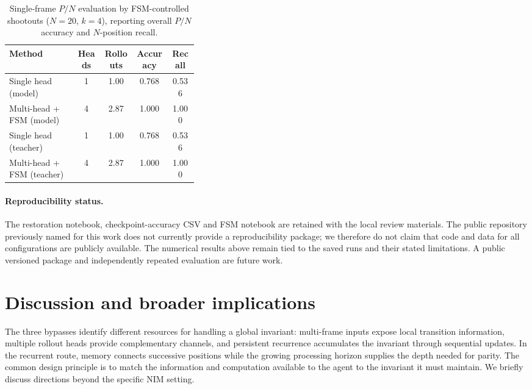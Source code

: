 \documentclass[twoside,11pt]{article}
\numberwithin{theorem}{section}
\numberwithin{equation}{section}
\begin{document}
\begin{table}[t]
\centering
\small
\begin{tabular}{p{0.36\linewidth}cccc}
\hline
Method & Heads & Rollouts & Accuracy & Recall \\
\hline
Single head (model) & 1 & 1.00 & 0.768 & 0.536 \\
Multi-head + FSM (model) & 4 & 2.87 & 1.000 & 1.000 \\
Single head (teacher) & 1 & 1.00 & 0.768 & 0.536 \\
Multi-head + FSM (teacher) & 4 & 2.87 & 1.000 & 1.000 \\
\hline
\end{tabular}
\caption{Single-frame $P/N$ evaluation by FSM-controlled shootouts ($N=20$, $k=4$), reporting overall $P/N$ accuracy and $N$-position recall.}
\label{tab:fsm-shootout}
\end{table}



\paragraph{Reproducibility status.}
The restoration notebook, checkpoint-accuracy CSV and FSM notebook are retained with the local review materials. The public repository previously named for this work does not currently provide a reproducibility package; we therefore do not claim that code and data for all configurations are publicly available. The numerical results above remain tied to the saved runs and their stated limitations. A public versioned package and independently repeated evaluation are future work.

\section{Discussion and broader implications}
\label{sec:discussion}

The three bypasses identify different resources for handling a global invariant: multi-frame inputs expose local transition information, multiple rollout heads provide complementary channels, and persistent recurrence accumulates the invariant through sequential updates. In the recurrent route, memory connects successive positions while the growing processing horizon supplies the depth needed for parity. The common design principle is to match the information and computation available to the agent to the invariant it must maintain. We briefly discuss directions beyond the specific NIM setting.
\end{document}
